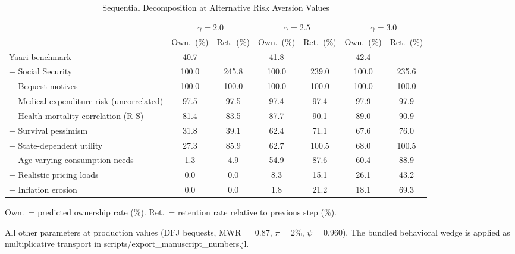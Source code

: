 \begin{table}[htbp]
\centering
\caption{Sequential Decomposition at Alternative Risk Aversion Values}
\label{tab:multigamma}
\begin{threeparttable}
\begin{tabular}{lcccccc}
\toprule
  & \multicolumn{2}{c}{$\gamma = 2.0$} & \multicolumn{2}{c}{$\gamma = 2.5$} & \multicolumn{2}{c}{$\gamma = 3.0$} \\
 & Own.\ (\%) & Ret.\ (\%) & Own.\ (\%) & Ret.\ (\%) & Own.\ (\%) & Ret.\ (\%) \\
\midrule
Yaari benchmark & 40.7 & --- & 41.8 & --- & 42.4 & --- \\
+ Social Security & 100.0 & 245.8 & 100.0 & 239.0 & 100.0 & 235.6 \\
+ Bequest motives & 100.0 & 100.0 & 100.0 & 100.0 & 100.0 & 100.0 \\
+ Medical expenditure risk (uncorrelated) & 97.5 & 97.5 & 97.4 & 97.4 & 97.9 & 97.9 \\
+ Health-mortality correlation (R-S) & 81.4 & 83.5 & 87.7 & 90.1 & 89.0 & 90.9 \\
+ Survival pessimism & 31.8 & 39.1 & 62.4 & 71.1 & 67.6 & 76.0 \\
+ State-dependent utility & 27.3 & 85.9 & 62.7 & 100.5 & 68.0 & 100.5 \\
+ Age-varying consumption needs & 1.3 & 4.9 & 54.9 & 87.6 & 60.4 & 88.9 \\
+ Realistic pricing loads & 0.0 & 0.0 & 8.3 & 15.1 & 26.1 & 43.2 \\
+ Inflation erosion & 0.0 & 0.0 & 1.8 & 21.2 & 18.1 & 69.3 \\
\bottomrule
\end{tabular}
\begin{tablenotes}
\small
\item Own.\ = predicted ownership rate (\%). Ret.\ = retention rate relative to previous step (\%).
\item All other parameters at production values (DFJ bequests, MWR $= 0.87$, $\pi = 2\%$, $\psi = 0.960$). The bundled behavioral wedge is applied as multiplicative transport in scripts/export_manuscript_numbers.jl.
\end{tablenotes}
\end{threeparttable}
\end{table}

